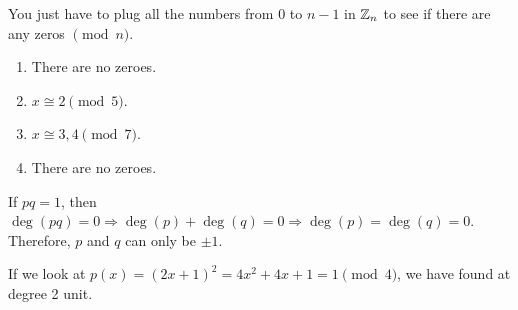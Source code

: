 \documentclass[12pt]{report}
\begin{document}
\sol You just have to plug all the numbers from $0$ to $n-1$ in $\ZZ_n$ to see if there are any zeros $\pmod{n}$.
\begin{enumerate}[label=\alph*.]
    \item There are no zeroes.
    \item $x \cong 2 \pmod{5}$.
    \item $x \cong 3,4 \pmod{7}$.
    \item There are no zeroes.
\end{enumerate}

\sol If $pq = 1$, then $\operatorname{deg}(pq) = 0 \Rightarrow\operatorname{deg}(p) + \operatorname{deg}(q) = 0 \Rightarrow \operatorname{deg}(p) = \operatorname{deg}(q) = 0 $. Therefore, $p$ and $q$ can only be $\pm 1$. 

\sol If we look at $p(x) = (2x+1)^2 = 4x^2 + 4x + 1 = 1 \pmod{4}$, we have found at degree 2 unit.
\end{document}
